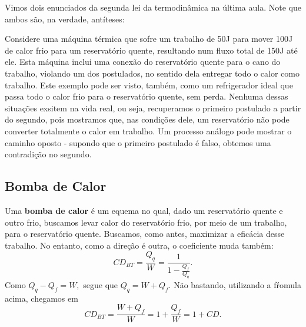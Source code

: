 \documentclass[PhysicsII/phsyicsII_notes.tex]{subfiles}
\begin{document}
Vimos dois enunciados da segunda lei da termodinâmica na última aula. Note que ambos são, na verdade,
antíteses:

Considere uma máquina térmica que sofre um trabalho de 50J para mover 100J de calor frio para um reservatório quente, resultando
num fluxo total de 150J até ele. Esta máquina inclui uma conexão do reservatório quente para o cano do trabalho, violando um dos postulados,
no sentido dela entregar todo o calor como trabalho. Este exemplo pode ser visto, também, como um refrigerador ideal que passa todo o calor
frio para o reservatório quente, sem perda. Nenhuma dessas situações exsitem na vida real, ou seja, recuperamos o primeiro postulado a partir do segundo,
pois mostramos que, nas condições dele, um reservatório não pode converter totalmente o calor em trabalho.
Um processo análogo pode mostrar o caminho oposto - supondo que o primeiro postulado é falso, obtemos uma contradição no segundo.
\subsection{Bomba de Calor}
Uma \textbf{bomba de calor} é um equema no qual, dado um reservatório quente e outro frio, buscamos levar calor do reservatório frio, por meio de um trabalho, para o reservatório quente.
Buscamos, como antes, maximizar a eficácia desse trabalho. No entanto, como a direção é outra, o coeficiente muda também:
\[
	\boxed{CD_{BT} = \frac{Q_{q}}{W} = \frac{1}{1-\frac{Q_{f}}{Q_{q}}}}.
\]
Como \(Q_{q} - Q_{f} = W,\) segue que \(Q_{q} = W + Q_{f}\). Não bastando, utilizando a fŕomula acima, chegamos em
\[
	CD_{BT} = \frac{W+Q_{f}}{W} = 1 + \frac{Q_{f}}{W} = 1 + CD.
\]
\end{document}
